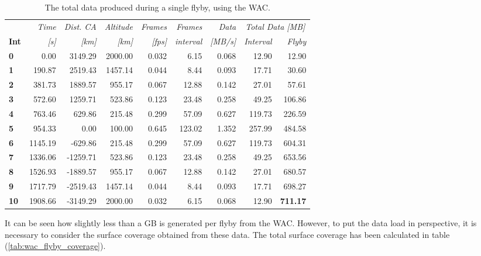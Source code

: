 \begin{table}[htb]
  \centering
    \begin{tabular}{l|r|r|r|r|r|r|r|r|}
      & \textit{Time} & \textit{Dist. CA} & \textit{Altitude} & \multicolumn{1}{c|}{\textit{Frames}} & \textit{Frames} & \textit{Data} & \multicolumn{2}{c}{\textit{Total Data [MB]}} \\
\textbf{Int} & \textit{[s]} & \textit{[km]} & \textit{[km]} & \textit{[fps]} & \textit{interval} & \textit{[MB/s]} & \textit{Interval} & \multicolumn{1}{r}{\textit{Flyby}} \bigstrut[b]\\
\hline
\textbf{0} & 0.00  & 3149.29 & 2000.00 & 0.032 & 6.15  & 0.068 & 12.90 & 12.90 \bigstrut[t]\\
\textbf{1} & 190.87 & 2519.43 & 1457.14 & 0.044 & 8.44  & 0.093 & 17.71 & 30.60 \\
\textbf{2} & 381.73 & 1889.57 & 955.17 & 0.067 & 12.88 & 0.142 & 27.01 & 57.61 \\
\textbf{3} & 572.60 & 1259.71 & 523.86 & 0.123 & 23.48 & 0.258 & 49.25 & 106.86 \\
\textbf{4} & 763.46 & 629.86 & 215.48 & 0.299 & 57.09 & 0.627 & 119.73 & 226.59 \\
\textbf{5} & 954.33 & 0.00  & 100.00 & 0.645 & 123.02 & 1.352 & 257.99 & 484.58 \\
\textbf{6} & 1145.19 & -629.86 & 215.48 & 0.299 & 57.09 & 0.627 & 119.73 & 604.31 \\
\textbf{7} & 1336.06 & -1259.71 & 523.86 & 0.123 & 23.48 & 0.258 & 49.25 & 653.56 \\
\textbf{8} & 1526.93 & -1889.57 & 955.17 & 0.067 & 12.88 & 0.142 & 27.01 & 680.57 \\
\textbf{9} & 1717.79 & -2519.43 & 1457.14 & 0.044 & 8.44  & 0.093 & 17.71 & 698.27 \\
\textbf{10} & 1908.66 & -3149.29 & 2000.00 & 0.032 & 6.15  & 0.068 & 12.90 & \textbf{711.17} \\
\end{tabular}%
      \caption{The total data produced during a single flyby, using the WAC.}
  \label{tab:wac_flyby_data}%
\end{table}%
It can be seen how slightly less than a GB is generated per flyby from the WAC. However, to put the data load in perspective, it is necessary to consider the surface coverage obtained from these data. The total surface coverage has been calculated in table (\ref{tab:wac_flyby_coverage}).
